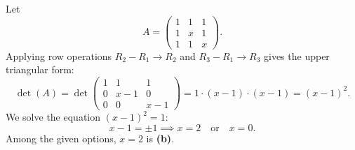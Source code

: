 \begin{exercisesolution*}
\label{sol:parameter_for_3x3_determinant_sc}
Let
\[
A = \begin{pmatrix} 1 & 1 & 1 \\ 1 & x & 1 \\ 1 & 1 & x \end{pmatrix}.
\]
Applying row operations $R_2 - R_1 \to R_2$ and $R_3 - R_1 \to R_3$ gives the upper triangular form:
\[
\det(A) = \det \begin{pmatrix} 1 & 1 & 1 \\ 0 & x-1 & 0 \\ 0 & 0 & x-1 \end{pmatrix} = 1 \cdot (x-1) \cdot (x-1) = (x-1)^2.
\]
We solve the equation $(x-1)^2 = 1$:
\[
x - 1 = \pm 1 \implies x = 2 \quad \text{or} \quad x = 0.
\]
Among the given options, $x = 2$ is \textbf{(b)}.
\end{exercisesolution*}

